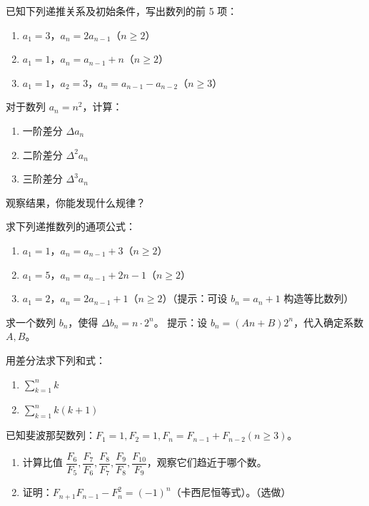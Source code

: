 \documentclass[fontset=fandol]{ctexart}
\begin{document}
\begin{exercise}已知下列递推关系及初始条件，写出数列的前 5 项：
\begin{enumerate}
\item \(a_1 = 3\)，\(a_n = 2a_{n-1}\)（\(n \geq 2\)）
\item \(a_1 = 1\)，\(a_n = a_{n-1} + n\)（\(n \geq 2\)）
\item \(a_1 = 1\)，\(a_2 = 3\)，\(a_n = a_{n-1} - a_{n-2}\)（\(n \geq 3\)）
\end{enumerate}
\end{exercise}

\begin{exercise}对于数列 \(a_n = n^2\)，计算：
\begin{enumerate}
\item 一阶差分 \(\Delta a_n\)
\item 二阶差分 \(\Delta^2 a_n\)
\item 三阶差分 \(\Delta^3 a_n\)
\end{enumerate}
观察结果，你能发现什么规律？
\end{exercise}

\begin{exercise}求下列递推数列的通项公式：
\begin{enumerate}
\item \(a_1 = 1\)，\(a_n = a_{n-1} + 3\)（\(n \geq 2\)）
\item \(a_1 = 5\)，\(a_n = a_{n-1} + 2n - 1\)（\(n \geq 2\)）
\item \(a_1 = 2\)，\(a_n = 2a_{n-1} + 1\)（\(n \geq 2\)）\quad（提示：可设 \(b_n = a_n + 1\) 构造等比数列）
\end{enumerate}
\end{exercise}

\begin{exercise}求一个数列 \(b_n\)，使得 \(\Delta b_n = n \cdot 2^n\)。
提示：设 \(b_n = (An + B)2^n\)，代入确定系数 \(A, B\)。
\end{exercise}

\begin{exercise}用差分法求下列和式：
\begin{enumerate}
\item \(\sum_{k=1}^{n} k\)
\item \(\sum_{k=1}^{n} k(k+1)\)
\end{enumerate}
\end{exercise}

\begin{exercise}已知斐波那契数列：\(F_1 = 1, F_2 = 1, F_n = F_{n-1} + F_{n-2} (n \geq 3)\)。
\begin{enumerate}
\item 计算比值 \(\dfrac{F_6}{F_5}, \dfrac{F_7}{F_6}, \dfrac{F_8}{F_7}, \dfrac{F_9}{F_8}, \dfrac{F_{10}}{F_9}\)，观察它们趋近于哪个数。
\item 证明：\(F_{n+1}F_{n-1} - F_n^2 = (-1)^n\)（卡西尼恒等式）。（选做）
\end{enumerate}
\end{exercise}
\end{document}
